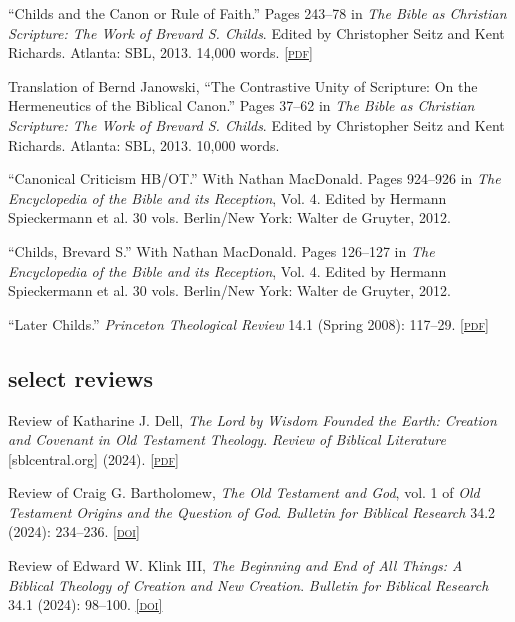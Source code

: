 \documentclass[11pt]{article}
\newcommand{\pdf}[1]{\href{#1}{\footnotesize\textsc{[pdf]}}}
\newcommand{\doi}[1]{\href{https://doi.org/#1}{\footnotesize\textsc{[doi]}}}
\newcommand{\years}[1]{\marginnote{\footnotesize #1}}
\begin{document}
\years{2013}
``Childs and the Canon or Rule of Faith.'' Pages 243--78 in \emph{The
Bible as Christian Scripture: The Work of Brevard S. Childs}. Edited by
Christopher Seitz and Kent Richards. Atlanta: SBL, 2013. 14,000 words.
\pdf{http://danieldriver.com/assets/pdf/publications/Driver_2013.pdf}

\years{2013}
Translation of Bernd Janowski, ``The Contrastive Unity of Scripture: On
the Hermeneutics of the Biblical Canon.'' Pages 37--62 in \emph{The
Bible as Christian Scripture: The Work of Brevard S. Childs}. Edited by
Christopher Seitz and Kent Richards. Atlanta: SBL, 2013. 10,000 words.

\years{2012}%
``Canonical Criticism HB/OT.'' With Nathan MacDonald. Pages 924–926 in
\emph{The Encyclopedia of the Bible and its Reception}, Vol. 4. Edited
by Hermann Spieckermann et al. 30 vols. Berlin/New York: Walter de
Gruyter, 2012.

\years{2012}
``Childs, Brevard S.'' With Nathan MacDonald. Pages 126–127 in \emph{The
Encyclopedia of the Bible and its Reception}, Vol. 4. Edited by Hermann
Spieckermann et al. 30 vols. Berlin/New York: Walter de Gruyter, 2012.

\years{2008}
``Later Childs.'' \emph{Princeton Theological Review} 14.1 (Spring 2008):
117--29.
\pdf{http://ptsptr.wpengine.com/wp-content/uploads/2016/11/38.pdf}


\subsection*{select reviews}

\years{2024}
Review of Katharine J. Dell, \emph{The Lord by Wisdom Founded the Earth: Creation and Covenant in Old Testament Theology}. \emph{Review of Biblical Literature} [sblcentral.org] (2024).
\pdf{https://www.sblcentral.org/API/Reviews/1002583_73084.pdf}

\years{2024}
Review of Craig G. Bartholomew, \emph{The Old Testament and God}, vol. 1 of \emph{Old Testament Origins and the Question of God}. \emph{Bulletin for Biblical Research} 34.2 (2024): 234--236.
\doi{10.5325/bullbiblrese.34.2.0234}

\years{2024}
Review of Edward W. Klink III, \emph{The Beginning and End of All Things: A Biblical Theology of Creation and New Creation}. \emph{Bulletin for Biblical Research} 34.1 (2024): 98–100.
\doi{10.5325/bullbiblrese.34.1.0098}
\end{document}
